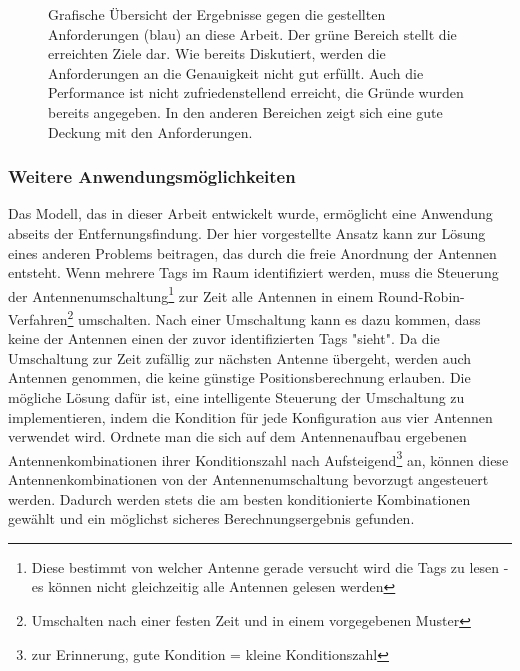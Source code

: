 \begin{figure}[ht!]
         \centering
         \caption[Anforderungsspinne]{ Grafische Übersicht der Ergebnisse gegen die gestellten Anforderungen (blau) an diese Arbeit. Der grüne Bereich stellt die erreichten Ziele dar. Wie bereits Diskutiert, werden die Anforderungen an die Genauigkeit nicht gut erfüllt. Auch die Performance ist nicht zufriedenstellend erreicht, die Gründe wurden bereits angegeben. In den anderen Bereichen zeigt sich eine gute Deckung mit den Anforderungen. }
         \vspace{2mm}
         \label{fig:Requirements_reached}
         
\end{figure}
%

\subsubsection{Weitere Anwendungsmöglichkeiten}
%
Das Modell, das in dieser Arbeit entwickelt wurde, ermöglicht eine Anwendung abseits der Entfernungsfindung. Der hier vorgestellte Ansatz kann zur Lösung eines anderen Problems beitragen, das durch die freie Anordnung der Antennen entsteht. Wenn mehrere Tags im Raum identifiziert werden, muss die Steuerung der Antennenumschaltung\footnote{Diese bestimmt von welcher Antenne gerade versucht wird die Tags zu lesen - es können nicht gleichzeitig alle Antennen gelesen werden} zur Zeit alle Antennen in einem Round-Robin-Verfahren\footnote{Umschalten nach einer festen Zeit und in einem vorgegebenen Muster} umschalten. Nach einer Umschaltung kann es dazu kommen, dass keine der Antennen einen der zuvor identifizierten Tags "sieht". Da die Umschaltung zur Zeit zufällig zur nächsten Antenne übergeht, werden auch Antennen genommen, die keine günstige Positionsberechnung erlauben. Die mögliche Lösung dafür ist, eine intelligente Steuerung der Umschaltung zu implementieren, indem die Kondition für jede Konfiguration aus vier Antennen verwendet wird. Ordnete man die sich auf dem Antennenaufbau ergebenen Antennenkombinationen ihrer Konditionszahl nach Aufsteigend\footnote{zur Erinnerung, gute Kondition = kleine Konditionszahl} an, können diese Antennenkombinationen von der Antennenumschaltung bevorzugt angesteuert werden. Dadurch werden stets die am besten konditionierte Kombinationen gewählt und ein möglichst sicheres Berechnungsergebnis gefunden.
%

